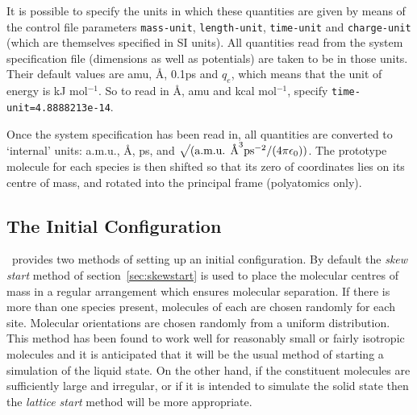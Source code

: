 It is possible to specify the units in which these quantities are given
by means of the control file parameters \verb'mass-unit',
\verb'length-unit', \verb'time-unit' and \verb'charge-unit' 
(which are themselves specified in SI units). All quantities read from
the system specification file (dimensions as well as potentials) are
taken to be in those units. Their default values are amu, \AA, 0.1ps
and $q_{e}$, which means that the unit of energy is kJ mol$^{-1}$.  So
to read in \AA, amu and kcal mol$^{-1}$, specify
\verb'time-unit=4.8888213e-14'.

Once the system specification has been read in, all quantities are
converted to `internal' units: a.m.u., \AA, ps, and $\sqrt{\mathstrut} (
\mbox{a.m.u. \AA}^{3} \mbox{ps}^{-2}/(4 \pi \epsilon_{0}) )$.
The prototype molecule for each species is then shifted so that its
zero of coordinates lies on its centre of mass, and rotated into the
principal frame (polyatomics only).

\subsection{The Initial Configuration}

\moldy\  provides two methods of setting up an initial configuration.
By default the {\em skew start\/} method of section~\ref{sec:skewstart}
is used to place the molecular centres of mass in a regular
arrangement which ensures molecular separation.  If there is more than
one species present, molecules of each are chosen randomly for each
site.  Molecular orientations are chosen randomly from a uniform
distribution.  This method has been found to work well for reasonably
small or fairly isotropic molecules and it is anticipated that it will
be the usual method of starting a simulation of the liquid state.   On
the other hand, if the constituent molecules are sufficiently large
and irregular, or if it is intended to simulate the solid state then
the {\em lattice start\/} method will be more appropriate.


